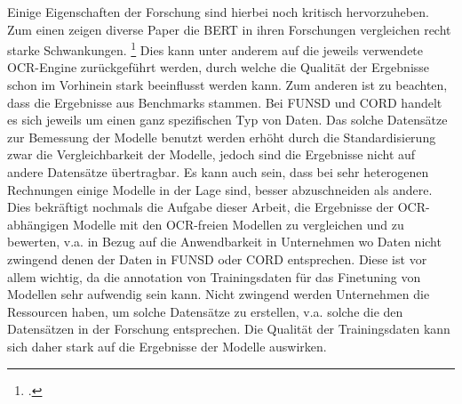   Einige Eigenschaften der Forschung sind hierbei noch kritisch hervorzuheben. Zum einen zeigen diverse Paper die \ac{BERT} in ihren Forschungen vergleichen recht starke Schwankungen. \footcites[Vgl.][]{huang_layoutlmv3_2022,aggarwal_dublin_2023,kim_ocr-free_2021} Dies kann unter anderem auf die jeweils verwendete OCR-Engine zurückgeführt werden, durch welche die Qualität der Ergebnisse schon im Vorhinein stark beeinflusst werden kann. Zum anderen ist zu beachten, dass die Ergebnisse aus Benchmarks stammen. Bei \ac{FUNSD} und \ac{CORD} handelt es sich jeweils um einen ganz spezifischen Typ von Daten. Das solche Datensätze zur Bemessung der Modelle benutzt werden erhöht durch die Standardisierung zwar die Vergleichbarkeit der Modelle, jedoch sind die Ergebnisse nicht auf andere Datensätze übertragbar. Es kann auch sein, dass bei sehr heterogenen Rechnungen einige Modelle in der Lage sind, besser abzuschneiden als andere. Dies bekräftigt nochmals die Aufgabe dieser Arbeit, die Ergebnisse der OCR-abhängigen Modelle mit den OCR-freien Modellen zu vergleichen und zu bewerten, v.a. in Bezug auf die Anwendbarkeit in Unternehmen wo Daten nicht zwingend denen der Daten in \ac{FUNSD} oder \ac{CORD} entsprechen. Diese ist vor allem wichtig, da die annotation von Trainingsdaten für das Finetuning von Modellen sehr aufwendig sein kann. Nicht zwingend werden Unternehmen die Ressourcen haben, um solche Datensätze zu erstellen, v.a. solche die den Datensätzen in der Forschung entsprechen. Die Qualität der Trainingsdaten kann sich daher stark auf die Ergebnisse der Modelle auswirken.

